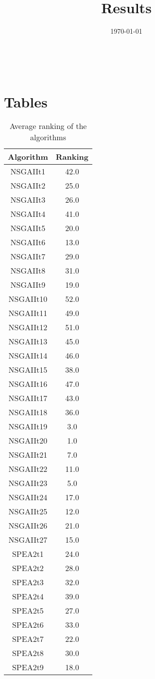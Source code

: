\documentclass{article}
\title{Results}
\author{}
\date{\today}
\begin{document}
\oddsidemargin 0in \topmargin 0in\maketitle
\
\section{Tables}
\begin{table}[!htp]
\centering
\caption{Average ranking of the algorithms}
\begin{tabular}{c|c}
Algorithm&Ranking\\
\hline
NSGAIIt1&42.0\\
NSGAIIt2&25.0\\
NSGAIIt3&26.0\\
NSGAIIt4&41.0\\
NSGAIIt5&20.0\\
NSGAIIt6&13.0\\
NSGAIIt7&29.0\\
NSGAIIt8&31.0\\
NSGAIIt9&19.0\\
NSGAIIt10&52.0\\
NSGAIIt11&49.0\\
NSGAIIt12&51.0\\
NSGAIIt13&45.0\\
NSGAIIt14&46.0\\
NSGAIIt15&38.0\\
NSGAIIt16&47.0\\
NSGAIIt17&43.0\\
NSGAIIt18&36.0\\
NSGAIIt19&3.0\\
NSGAIIt20&1.0\\
NSGAIIt21&7.0\\
NSGAIIt22&11.0\\
NSGAIIt23&5.0\\
NSGAIIt24&17.0\\
NSGAIIt25&12.0\\
NSGAIIt26&21.0\\
NSGAIIt27&15.0\\
SPEA2t1&24.0\\
SPEA2t2&28.0\\
SPEA2t3&32.0\\
SPEA2t4&39.0\\
SPEA2t5&27.0\\
SPEA2t6&33.0\\
SPEA2t7&22.0\\
SPEA2t8&30.0\\
SPEA2t9&18.0\\

\end{tabular}
\end{table}
\end{document}
